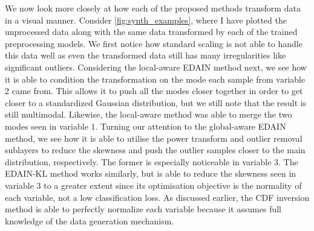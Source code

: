 \documentclass{statsmsc}
\begin{document}
{%
We now look more closely at how each of the proposed methods transform data in a visual manner.
Consider \cref{fig:synth_examples}, where I have plotted the unprocessed data along with the same
data transformed by each of the trained preprocessing models. We first
notice how standard scaling is not able to handle this data well as even the transformed data still
has many irregularities like significant outliers. Considering the local-aware \ac{EDAIN} method
next, we see how it is able to condition the transformation on the mode each sample from variable
2 came from. This allows it to push all the modes closer together in order to get closer to a
standardized Gaussian distribution, but we still note that the result is still multimodal.
Likewise, the local-aware method was able to merge the two modes seen in variable 1.
Turning our attention to the global-aware \ac{EDAIN} method, we see how it is able to utilise
the power transform and outlier removal sublayers to reduce the skewness and push the outlier
samples closer to the main distribution, respectively. The former is especially noticeable in
variable 3. The \ac{EDAIN-KL} method works similarly, but is able to reduce the skewness seen
in variable 3 to a greater extent since its optimisation objective is the normality of each
variable, not a low classification loss.
As discussed earlier, the \ac{CDF} inversion method is able to perfectly normalize each variable
because it assumes full knowledge of the data generation mechanism.

}
\end{document}
